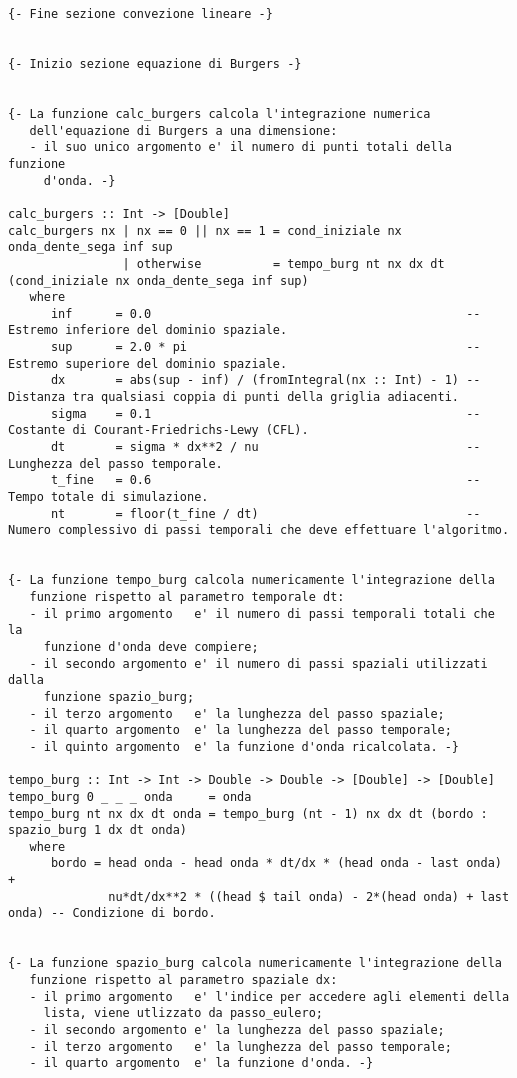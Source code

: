 \begin{verbatim}
{- Fine sezione convezione lineare -}


{- Inizio sezione equazione di Burgers -}


{- La funzione calc_burgers calcola l'integrazione numerica
   dell'equazione di Burgers a una dimensione:
   - il suo unico argomento e' il numero di punti totali della funzione
     d'onda. -}

calc_burgers :: Int -> [Double]
calc_burgers nx | nx == 0 || nx == 1 = cond_iniziale nx onda_dente_sega inf sup                       
                | otherwise          = tempo_burg nt nx dx dt (cond_iniziale nx onda_dente_sega inf sup)
   where
      inf      = 0.0                                            -- Estremo inferiore del dominio spaziale. 
      sup      = 2.0 * pi                                       -- Estremo superiore del dominio spaziale. 
      dx       = abs(sup - inf) / (fromIntegral(nx :: Int) - 1) -- Distanza tra qualsiasi coppia di punti della griglia adiacenti.
      sigma    = 0.1                                            -- Costante di Courant-Friedrichs-Lewy (CFL).
      dt       = sigma * dx**2 / nu                             -- Lunghezza del passo temporale.
      t_fine   = 0.6                                            -- Tempo totale di simulazione.
      nt       = floor(t_fine / dt)                             -- Numero complessivo di passi temporali che deve effettuare l'algoritmo.


{- La funzione tempo_burg calcola numericamente l'integrazione della
   funzione rispetto al parametro temporale dt:
   - il primo argomento   e' il numero di passi temporali totali che la
     funzione d'onda deve compiere; 
   - il secondo argomento e' il numero di passi spaziali utilizzati dalla
     funzione spazio_burg;       
   - il terzo argomento   e' la lunghezza del passo spaziale;
   - il quarto argomento  e' la lunghezza del passo temporale;
   - il quinto argomento  e' la funzione d'onda ricalcolata. -}

tempo_burg :: Int -> Int -> Double -> Double -> [Double] -> [Double]
tempo_burg 0 _ _ _ onda     = onda
tempo_burg nt nx dx dt onda = tempo_burg (nt - 1) nx dx dt (bordo : spazio_burg 1 dx dt onda)
   where
      bordo = head onda - head onda * dt/dx * (head onda - last onda) +
              nu*dt/dx**2 * ((head $ tail onda) - 2*(head onda) + last onda) -- Condizione di bordo.


{- La funzione spazio_burg calcola numericamente l'integrazione della
   funzione rispetto al parametro spaziale dx:
   - il primo argomento   e' l'indice per accedere agli elementi della 
     lista, viene utlizzato da passo_eulero; 
   - il secondo argomento e' la lunghezza del passo spaziale;
   - il terzo argomento   e' la lunghezza del passo temporale;
   - il quarto argomento  e' la funzione d'onda. -}


\end{verbatim}
